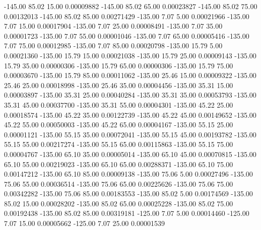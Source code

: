    -145.00     85.02     15.00     0.00009882
   -145.00     85.02     65.00     0.00023827
   -145.00     85.02     75.00     0.00132013
   -145.00     85.02     85.00     0.00271429
   -135.00      7.07      5.00     0.00021966
   -135.00      7.07     15.00     0.00017904
   -135.00      7.07     25.00     0.00008491
   -135.00      7.07     35.00     0.00001723
   -135.00      7.07     55.00     0.00001046
   -135.00      7.07     65.00     0.00005416
   -135.00      7.07     75.00     0.00012985
   -135.00      7.07     85.00     0.00020798
   -135.00     15.79      5.00     0.00021360
   -135.00     15.79     15.00     0.00021038
   -135.00     15.79     25.00     0.00009143
   -135.00     15.79     35.00     0.00000306
   -135.00     15.79     65.00     0.00000306
   -135.00     15.79     75.00     0.00003670
   -135.00     15.79     85.00     0.00011062
   -135.00     25.46     15.00     0.00009322
   -135.00     25.46     25.00     0.00018998
   -135.00     25.46     35.00     0.00004456
   -135.00     35.31     15.00     0.00003897
   -135.00     35.31     25.00     0.00040284
   -135.00     35.31     35.00     0.00053793
   -135.00     35.31     45.00     0.00037700
   -135.00     35.31     55.00     0.00004301
   -135.00     45.22     25.00     0.00018574
   -135.00     45.22     35.00     0.00122739
   -135.00     45.22     45.00     0.00149652
   -135.00     45.22     55.00     0.00050003
   -135.00     45.22     65.00     0.00004167
   -135.00     55.15     25.00     0.00001121
   -135.00     55.15     35.00     0.00072041
   -135.00     55.15     45.00     0.00193782
   -135.00     55.15     55.00     0.00217274
   -135.00     55.15     65.00     0.00115863
   -135.00     55.15     75.00     0.00004767
   -135.00     65.10     35.00     0.00005014
   -135.00     65.10     45.00     0.00070815
   -135.00     65.10     55.00     0.00219023
   -135.00     65.10     65.00     0.00288371
   -135.00     65.10     75.00     0.00147212
   -135.00     65.10     85.00     0.00009138
   -135.00     75.06      5.00     0.00027496
   -135.00     75.06     55.00     0.00036514
   -135.00     75.06     65.00     0.00225626
   -135.00     75.06     75.00     0.00342282
   -135.00     75.06     85.00     0.00183553
   -135.00     85.02      5.00     0.00174569
   -135.00     85.02     15.00     0.00028202
   -135.00     85.02     65.00     0.00025228
   -135.00     85.02     75.00     0.00192438
   -135.00     85.02     85.00     0.00319181
   -125.00      7.07      5.00     0.00014460
   -125.00      7.07     15.00     0.00005662
   -125.00      7.07     25.00     0.00001539
